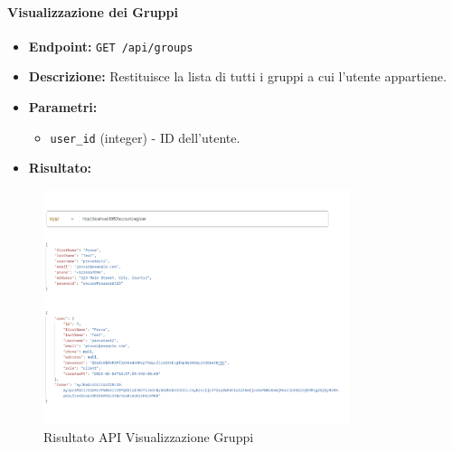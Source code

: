 \paragraph{Visualizzazione dei Gruppi}
\begin{itemize}
    \item \textbf{Endpoint:} \texttt{GET /api/groups}
    \item \textbf{Descrizione:} Restituisce la lista di tutti i gruppi a cui l'utente appartiene.
    \item \textbf{Parametri:}
    \begin{itemize}
        \item \texttt{user\_id} (integer) - ID dell'utente.
    \end{itemize}
    \item \textbf{Risultato:}
\end{itemize}
\begin{figure}[h!]
    \centering
    \includegraphics[width=0.8\textwidth]{images/registerapi.png}
    \caption{Risultato API Visualizzazione Gruppi}
    \label{fig:api_view_groups}
\end{figure}


